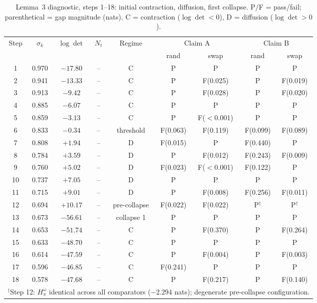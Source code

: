\documentclass[12pt]{article}
\begin{document}
\begin{table}[ht]
\centering
\caption{Lemma~3 diagnostic, steps 1--18: initial contraction, diffusion, first collapse. P/F = pass/fail; parenthetical = gap magnitude (nats). C = contraction ($\log\det < 0$), D = diffusion ($\log\det > 0$).}
\label{tab:steps1-18}
\small
\begin{tabular}{ccccccccc}
\toprule
Step & $\sigma_k$ & $\log\det$ & $N_t$ & Regime & \multicolumn{2}{c}{Claim A} & \multicolumn{2}{c}{Claim B} \\
 & & & & & rand & swap & rand & swap \\
\midrule
1  & 0.970 & $-17.80$ & -- & C & P & P & P & P \\
2  & 0.941 & $-13.33$ & -- & C & P & F(0.025) & P & F(0.019) \\
3  & 0.913 & $-9.42$  & -- & C & P & F(0.028) & P & F(0.020) \\
4  & 0.885 & $-6.07$  & -- & C & P & P & P & P \\
5  & 0.859 & $-3.13$  & -- & C & P & F($<$0.001) & P & P \\
6  & 0.833 & $-0.34$  & -- & threshold & F(0.063) & F(0.119) & F(0.099) & F(0.089) \\
7  & 0.808 & $+1.94$  & -- & D & F(0.015) & P & F(0.440) & P \\
8  & 0.784 & $+3.59$  & -- & D & P & F(0.012) & F(0.243) & F(0.009) \\
9  & 0.760 & $+5.02$  & -- & D & F(0.023) & F($<$0.001) & F(0.122) & P \\
10 & 0.737 & $+7.05$  & -- & D & P & P & P & P \\
11 & 0.715 & $+9.01$  & -- & D & P & F(0.008) & F(0.256) & F(0.011) \\
12 & 0.694 & $+10.17$ & -- & pre-collapse & F(0.022) & F(0.022) & P$^\dagger$ & P$^\dagger$ \\
13 & 0.673 & $-56.61$ & -- & collapse 1 & P & P & P & P \\
14 & 0.653 & $-51.74$ & -- & C & P & F(0.370) & P & F(0.264) \\
15 & 0.633 & $-48.70$ & -- & C & P & P & P & P \\
16 & 0.614 & $-47.59$ & -- & C & P & F(0.004) & P & F(0.003) \\
17 & 0.596 & $-46.85$ & -- & C & F(0.241) & P & P & P \\
18 & 0.578 & $-47.68$ & -- & C & P & F(0.217) & P & F(0.140) \\
\bottomrule
\multicolumn{9}{l}{$^\dagger$Step 12: $H^\omega_\pi$ identical across all comparators ($-2.294$ nats); degenerate pre-collapse configuration.}
\end{tabular}
\end{table}
\end{document}

